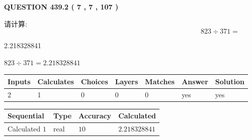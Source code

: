 \documentclass{ctexart}
\begin{document}
   
  
\vspace{0.2in}
  
{\textbf{\Large{QUESTION
439.2 
 ( 7 , 7 , 107 )
}}}
  
  
 
请计算:
\begin{equation}
823  \div    %
371 = \nonumber
\end{equation}
 
 
 
\noindent{}
 
 

2.218328841
 
 
\noindent{}
 
 

 
 
 
\noindent{}
 
 

$ %
823 \div  %
371=   %
2.218328841$
 
 
\noindent{}
 
 

 
   
   
   
   
\noindent\begin{tabular}{|l|l|l|l|l|l|l|}
 \hline
Inputs & Calculates & Choices & Layers & Matches & Answer & Solution \\ \hline
 2  & 
 1  & 
 0
  & 
 0  & 
 0  & 
  yes & 
  yes 
  \\ \hline
 \end{tabular}
   
   
   
   
\noindent{}
   
   
  
  
\noindent\begin{tabular}{|l|l|l|l|}
\hline
 Sequential & Type & Accuracy & Calculated \\ 
\hline
 
 
  Calculated $  1 $ & real & $  10  $ & 
 $ 2.218328841 $ 
 \\  \hline  
 \end{tabular}
   
\end{document}
